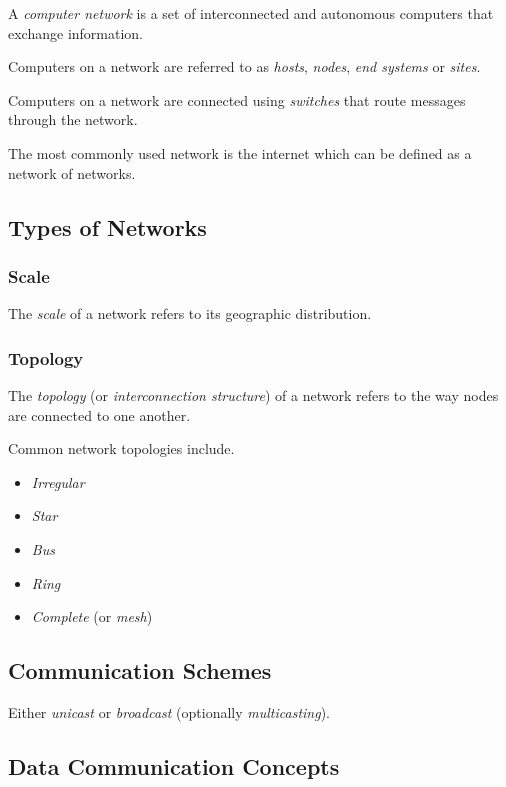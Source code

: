\documentclass[12pt]{article}
\begin{document}
A \textit{computer network} is a set of interconnected and autonomous computers that exchange information.

Computers on a network are referred to as \textit{hosts}, \textit{nodes}, \textit{end systems} or \textit{sites}.

Computers on a network are connected using \textit{switches} that route messages through the network.

The most commonly used network is the internet which can be defined as a network of networks.

\subsection{Types of Networks}

\subsubsection{Scale}

The \textit{scale} of a network refers to its geographic distribution.

\subsubsection{Topology}

The \textit{topology} (or \textit{interconnection structure}) of a network refers to the way nodes are connected to one another.

Common network topologies include.
\begin{itemize}
	\item \textit{Irregular}
	\item \textit{Star}
	\item \textit{Bus}
	\item \textit{Ring}
	\item \textit{Complete} (or \textit{mesh})
\end{itemize}

\subsection{Communication Schemes}

Either \textit{unicast} or \textit{broadcast} (optionally \textit{multicasting}).

\subsection{Data Communication Concepts}
\end{document}
